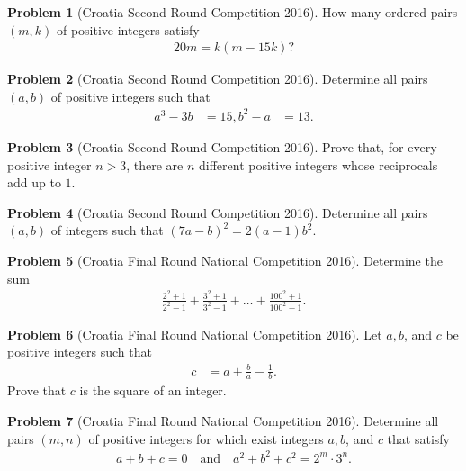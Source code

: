 \documentclass[]{article}
\theoremstyle{definition}
\newtheorem{problem}{Problem}
\begin{document}
\begin{problem}[Croatia Second Round Competition 2016]
	How many ordered pairs $(m, k)$ of positive integers satisfy
		\begin{align*}
			20m = k(m - 15k)?
		\end{align*}
\end{problem}



\begin{problem}[Croatia Second Round Competition 2016]
	Determine all pairs $(a, b)$ of positive integers such that
		\begin{align*}
			a^3 - 3b &= 15,
			b^2 - a  &= 13.
		\end{align*}
\end{problem}




\begin{problem}[Croatia Second Round Competition 2016]
	 Prove that, for every positive integer $n > 3$, there are $n$ different positive integers whose reciprocals add up to $1$.
\end{problem}



\begin{problem}[Croatia Second Round Competition 2016]
	Determine all pairs $(a, b)$ of integers such that $(7a - b)^2 = 2(a - 1)b^2$.
\end{problem}




\begin{problem}[Croatia Final Round National Competition 2016]
	Determine the sum
		\begin{align*}
			\frac{2^2+1}{2^2-1} + \frac{3^2+1}{3^2-1} + \dots + \frac{100^2+1}{100^2-1}.
		\end{align*}
\end{problem}



\begin{problem}[Croatia Final Round National Competition 2016]
	Let $a,b$, and $c$ be positive integers such that
		\begin{align*}
			c &= a + \frac{b}{a} - \frac{1}{b}.
		\end{align*}
	Prove that $c$ is the square of an integer.
\end{problem}




\begin{problem}[Croatia Final Round National Competition 2016]
	Determine all pairs $(m, n)$ of positive integers for which exist integers $a, b$, and $c$ that satisfy
		\begin{align*}
			a+b+c=0 \quad \text{and} \quad a^2+b^2+c^2=2^m \cdot 3^n.
		\end{align*}
\end{problem}
\end{document}
